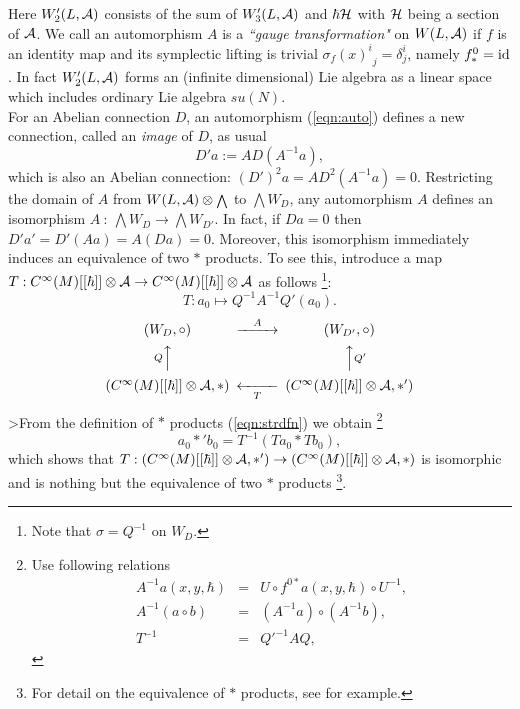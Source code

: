 \documentclass[10pt,a4paper]{article}
\def\h{\hbar}
\begin{document}
Here $W_2'(L,{\cal A})$ consists of the sum of $W_3'(L,{\cal A})$ and $\h{\cal H}$ with ${\cal H}$ being a section of ${\cal A}$. We call an automorphism $A$ is a {\it ``gauge transformation"} on $W(L,{\cal A})$ if $f$ is an identity map and its symplectic lifting is trivial ${\sigma_f(x)^i}_j=\delta^i_j$, namely $f^0_*={\rm id}$. In fact $W_2'(L,{\cal A})$ forms an (infinite dimensional) Lie algebra as a linear space which includes ordinary Lie algebra $su(N)$.\\

For an Abelian connection $D$, an automorphism (\ref{eqn:auto}) defines a new connection, called an {\it image} of $D$, as usual
\begin{equation}
\label{eqn:ADA}
D'a:=AD(A^{-1}a),
\end{equation}
which is also an Abelian connection: $(D')^2 a=AD^2 (A^{-1}a)=0$.
Restricting the domain of $A$ from $W(L,{\cal A})\otimes {\scriptstyle \bigwedge}$ to ${\scriptstyle \bigwedge} W_D$, any automorphism $A$ defines an isomorphism $A\ :\ {\scriptstyle \bigwedge} W_D\rightarrow{\scriptstyle \bigwedge} W_{D'}$. In fact, if $Da=0$ then $D'a'=D'(Aa)=A(Da)=0$. Moreover, this isomorphism immediately induces an equivalence of two $*$ products. To see this, introduce a map $T:C^\infty(M)[[\h]]\otimes {\cal A}\rightarrow C^\infty(M)[[\h]]\otimes {\cal A}$ as follows
\footnote{Note that $\sigma=Q^{-1}$ on $W_D$.}:
\begin{equation}
\label{eqn:tqaq}
T:a_0\mapsto Q^{-1}A^{-1}Q'(a_0).
\end{equation}
\[
\begin{CD}
(W_D,\circ)                       @>{A}>>  (W_{D'},\circ) \\
@A{Q}AA                                       @AA{Q'}A \\
(C^\infty(M)[[\h]]\otimes {\cal A},*) @<<{T}<   (C^\infty(M)[[\h]]\otimes {\cal A},*')
\end{CD}
\]
>From the definition of $*$ products (\ref{eqn:strdfn}) we obtain
\footnote{Use following relations
\begin{eqnarray}
A^{-1}a(x,y,\h)&=&U\circ f^{0*}a(x,y,\h)\circ U^{-1},\nonumber\\
A^{-1}(a\circ b)&=&(A^{-1}a)\circ(A^{-1}b),\nonumber\\
T^{-1}&=&{Q'}^{-1}AQ,
\end{eqnarray}
}
\begin{equation}
\label{eqn:ststp}
a_0*'b_0=T^{-1}(Ta_0*Tb_0), 
\end{equation}
which shows that $T:(C^\infty(M)[[\h]]\otimes {\cal A},*')\rightarrow(C^\infty(M)[[\h]]\otimes {\cal A},*)$ is isomorphic and is nothing but the equivalence of two $*$ products
\footnote{
For detail on the equivalence of $*$ products, see \cite{BCG} for example.
}.\\
\end{document}
